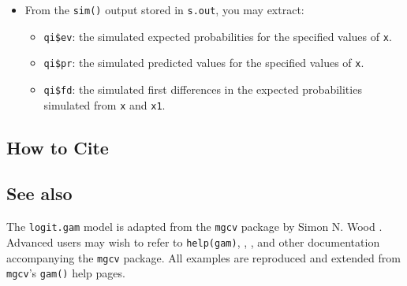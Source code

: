 \begin{itemize}
\item From the {\tt sim()} output stored in {\tt s.out}, you may extract:
\begin{itemize}
\item {\tt qi\$ev}: the simulated expected probabilities for the specified values of {\tt x}.
\item {\tt qi\$pr}: the simulated predicted values for the specified values of {\tt x}.
\item {\tt qi\$fd}: the simulated first differences in the expected probabilities simulated from {\tt x} and {\tt x1}.
\end{itemize}
\end{itemize}

\subsection* {How to Cite} 



\subsection* {See also}
The {\tt logit.gam} model is adapted from the  {\tt mgcv} package by Simon N. Wood \citep{Wood06}. Advanced users may wish to refer to {\tt help(gam)},  \cite{Wood04}, \cite{Wood00}, and other documentation accompanying the {\tt mgcv} package. All examples are reproduced and extended from {\tt mgcv}'s {\tt gam()} help pages.
